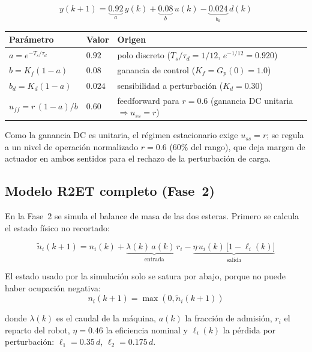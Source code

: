 \begin{equation}
\boxed{y(k+1) = \underbrace{0.92}_a\,y(k) + \underbrace{0.08}_b\,u(k) - \underbrace{0.024}_{b_d}\,d(k)}
\label{eq:planta_servo}
\end{equation}

\begin{center}
\small
\begin{tabular}{@{}lll@{}}
\toprule
Parámetro & Valor & Origen \\ \midrule
$a = e^{-T_s/\tau_d}$ & $0.92$ & polo discreto ($T_s/\tau_d = 1/12$, $e^{-1/12}=0.920$) \\
$b = K_f(1-a)$ & $0.08$ & ganancia de control ($K_f = G_p(0) = 1.0$) \\
$b_d = K_d(1-a)$ & $0.024$ & sensibilidad a perturbación ($K_d = 0.30$) \\
$u_{ff} = r\,(1-a)/b$ & $0.60$ & feedforward para $r=0.6$ (ganancia DC unitaria $\Rightarrow u_{ss}=r$) \\
\bottomrule
\end{tabular}
\end{center}

Como la ganancia DC es unitaria, el régimen estacionario exige $u_{ss}=r$; se regula a un nivel de operación normalizado $r=0.6$ ($60\%$ del rango), que deja margen de actuador en ambos sentidos para el rechazo de la perturbación de carga.

\subsection*{Modelo R2ET completo (Fase~2)}

En la Fase~2 se simula el balance de masa de las dos esteras. Primero se calcula el estado físico no recortado:

\begin{equation}
\tilde n_i(k+1) = n_i(k)
  + \underbrace{\lambda(k)\,a(k)\,r_i}_{\text{entrada}}
  - \underbrace{\eta\,u_i(k)\,\bigl[1-\ell_i(k)\bigr]}_{\text{salida}}
\label{eq:r2et_raw}
\end{equation}

El estado usado por la simulación solo se satura por abajo, porque no puede haber ocupación negativa:
\begin{equation}
n_i(k+1)=\max\!\left(0,\tilde n_i(k+1)\right)
\label{eq:r2et_aware}
\end{equation}

donde $\lambda(k)$ es el caudal de la máquina, $a(k)$ la fracción de admisión, $r_i$ el reparto del robot, $\eta=0.46$ la eficiencia nominal y $\ell_i(k)$ la pérdida por perturbación:
$\ell_1=0.35\,d$, $\ell_2=0.175\,d$.

